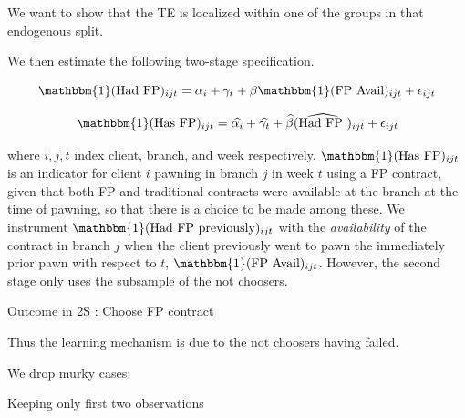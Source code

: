 \documentclass[oneside,11pt]{article}
\begin{document}
We want to show that the TE is localized within one of the groups in that endogenous split. 

We then estimate the following two-stage specification.


\begin{equation}
    \mathbbm{1}(\text{Had FP})_{ijt} = \alpha_i + \gamma_t + \beta \mathbbm{1}(\text{FP Avail})_{ijt}  + \epsilon_{ijt}
    \label{eqn:fs}
\end{equation}


\begin{equation}
    \mathbbm{1}(\text{Has FP})_{ijt} = \widehat{\alpha_i }+ \widehat{\gamma_t} + \widehat{\beta }(\widehat{\text{Had FP }})_{ijt}  + \epsilon_{ijt}
    \label{eqn:2s}
\end{equation}



where $i,j,t$ index client, branch, and week respectively. $\mathbbm{1}(\text{Has FP})_{ijt}$ is an indicator for client $i$ pawning in branch $j$ in week $t$ using a FP contract, given that both FP and traditional contracts were available at the branch at the time of pawning, so that there is a choice to be made among these. We instrument $\mathbbm{1}(\text{Had FP previously})_{ijt}$ with the \textit{availability} of the contract in branch $j$  when the client previously went to pawn the immediately prior pawn with respect to $t$, $\mathbbm{1}(\text{FP Avail})_{ijt}$. However, the second stage only uses the subsample of the not choosers. 



\begin{table}[H]
\caption{Outcome in 2S : Choose FP contract}
\label{iv_pf}
\begin{center}
\scriptsize{}
\end{center}
 \scriptsize

\end{table}

Thus the learning mechanism is due to the not choosers having failed. 


We drop murky cases:


\begin{table}[H]
\caption{Keeping only first two observations}
\begin{center}
\scriptsize{}
\end{center}
 \scriptsize

\end{table}
\end{document}
